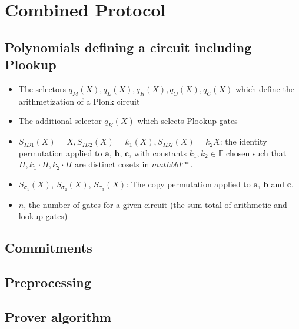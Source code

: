 \documentclass[fleqn]{article}
\begin{document}
	\section{Combined Protocol}
		\subsection{Polynomials defining a circuit including Plookup}
			\begin{itemize}
				\item The selectors $q_M(X), q_L(X), q_R(X), q_O(X), q_C(X)$ which define the arithmetization of a Plonk circuit
				\item The additional selector $q_K(X)$ which selects Plookup gates
				\item $S_{ID1}(X) = X, S_{ID2}(X) = k_1(X), S_{ID2}(X)=k_2X$: the identity permutation applied to $\mathbf{a}$, $\mathbf{b}$, $\mathbf{c}$, with constants $k_1, k_2\in \mathbb{F}$ chosen such that $H, k_1\cdot H, k_2\cdot H$ are distinct cosets in $mathbb{F*}$.
				\item $S_{\sigma_1}(X)$, $S_{\sigma_2}(X)$, $S_{\sigma_3}(X)$: The copy permutation applied to $\mathbf{a}$, $\mathbf{b}$ and $\mathbf{c}$.
				\item $n$, the number of gates for a given circuit (the sum total of arithmetic and lookup gates)
			\end{itemize}
		\subsection{Commitments}
		\subsection{Preprocessing}
		\subsection{Prover algorithm}
\end{document}
